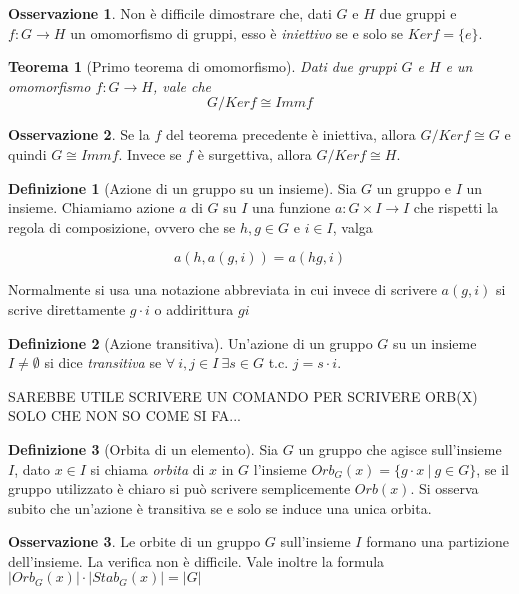 \documentclass[11pt]{article}
\theoremstyle{plain}
\newtheorem{thm}{Teorema}[section]
\theoremstyle{definition}
\newtheorem{defn}{Definizione}[section]
\newtheorem*{rem}{Osservazione}
\theoremstyle{remark}
\begin{document}
\begin{rem}
	Non è difficile dimostrare che, dati $G$ e $H$ due gruppi e $f:G\to H$ un omomorfismo di gruppi, esso è \textit{iniettivo} se e solo se $Ker f = \{e\}$.
\end{rem}


\begin{thm}[Primo teorema di omomorfismo]\label{alg:primo_teo_omo}
	Dati due gruppi $G$ e $H$ e un omomorfismo $f:G\to H$, vale che
	\[
		G/Ker f \cong Imm f
	\]
\end{thm}
\begin{rem}
	Se la $f$ del teorema precedente è iniettiva, allora $G/Ker f\cong G$ e quindi $G\cong Imm f$. Invece se $f$ è surgettiva, allora $G/Ker f\cong H$.
\end{rem}



\begin{defn}[Azione di un gruppo su un insieme] Sia $G$ un gruppo e $I$ un insieme. Chiamiamo azione $a$ di $G$ su $I$ una funzione $a:G\times I \to I$ che rispetti la regola di composizione, ovvero che se $h,g\in G$ e $i \in I$, valga

\[ a(h,a(g,i)) = a(hg, i) \]

Normalmente si usa una notazione abbreviata in cui invece di scrivere $a(g,i)$ si scrive direttamente $g\cdot i$ o addirittura $gi$


\label{defn:azione}
\end{defn}


\begin{defn}[Azione transitiva]
Un'azione di un gruppo $G$ su un insieme $I\neq \emptyset$ si dice \textit{transitiva} se $\forall\ i,j\in I\ \exists s\in G$ t.c. $j=s\cdot i$.
\label{defn:azione transitiva}
\end{defn}

SAREBBE UTILE SCRIVERE UN COMANDO PER SCRIVERE ORB(X) SOLO CHE NON SO COME SI FA...
\begin{defn}[Orbita di un elemento]
Sia $G$ un gruppo che agisce sull'insieme $I$, dato $x\in I$ si chiama \textit{orbita} di $x$ in $G$ l'insieme $Orb_{G}(x)=\{ g\cdot x\ |\ g\in G \}$, se il gruppo utilizzato è chiaro si può scrivere semplicemente $Orb(x)$. Si osserva subito che un'azione è transitiva se e solo se induce una unica orbita.
\label{defn:orbita}
\end{defn}

\begin{rem} Le orbite di un gruppo $G$ sull'insieme $I$ formano una partizione dell'insieme. La verifica non è difficile. Vale inoltre la formula $|Orb_G(x)| \cdot |Stab_G(x)| = |G|$



\end{rem}
\end{document}
